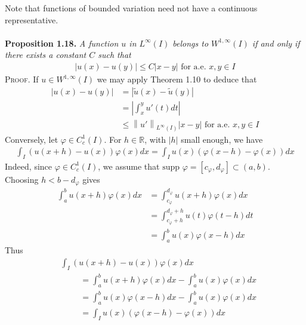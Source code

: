\documentclass[a4paper,oneside]{article}
\numberwithin{equation}{section}
\begin{document}
Note that functions of bounded variation need not have a continuous representative.\\
\\
\textbf{Proposition 1.18.} \textit{A function $u$ in $L^\infty \left(I\right)$ belongs to $W^{1,\infty}\left(I\right)$ if and only if there exists a constant $C$ such that}
\begin{align}
\label{1.101}
\left| {u\left( x \right) - u\left( y \right)} \right| \le C\left| {x - y} \right|\mbox{ for a.e. }x,y \in I
\end{align}
\textsc{Proof.} If $u \in {W^{1,\infty }}\left( I \right)$ we may apply Theorem 1.10 to deduce that
\begin{align}
\left| {u\left( x \right) - u\left( y \right)} \right| &= \left| {\tilde u\left( x \right) - \tilde u\left( y \right)} \right|\\
 &= \left| {\int_x^y {u'\left( t \right)dt} } \right|\\
 &\le {\left\| {u'} \right\|_{{L^\infty }\left( I \right)}}\left| {x - y} \right|\mbox{ for a.e. }x,y \in I
\end{align}
Conversely, let $\varphi  \in C_c^1\left( I \right)$. For $h\in \mathbb{R}$, with $\left| h \right|$ small enough, we have
\begin{align}
\int_I {\left( {u\left( {x + h} \right) - u\left( x \right)} \right)\varphi \left( x \right)dx}  = \int_I {u\left( x \right)\left( {\varphi \left( {x - h} \right) - \varphi \left( x \right)} \right)dx} 
\end{align}
Indeed, since $\varphi  \in C_c^1\left( I \right)$, we assume that $\mbox{supp }\varphi  = \left[ {c_\varphi,d_\varphi} \right] \subset \left( {a,b} \right)$. Choosing $h < b - {d_\varphi }$ gives
\begin{align}
\int_a^b {u\left( {x + h} \right)\varphi \left( x \right)dx}  &= \int_{{c_\varphi }}^{{d_\varphi }} {u\left( {x + h} \right)\varphi \left( x \right)dx} \\
 &= \int_{{c_\varphi } + h}^{{d_\varphi } + h} {u\left( t \right)\varphi \left( {t - h} \right)dt} \\
 &= \int_a^b {u\left( x \right)\varphi \left( {x - h} \right)dx} 
\end{align}
Thus
\begin{align}
&\int_I {\left( {u\left( {x + h} \right) - u\left( x \right)} \right)\varphi \left( x \right)dx} \\
& \hspace{1cm}= \int_a^b {u\left( {x + h} \right)\varphi \left( x \right)dx}  - \int_a^b {u\left( x \right)\varphi \left( x \right)dx} \\
& \hspace{1cm} = \int_a^b {u\left( x \right)\varphi \left( {x - h} \right)dx}  - \int_a^b {u\left( x \right)\varphi \left( x \right)dx} \\
& \hspace{1cm} = \int_I {u\left( x \right)\left( {\varphi \left( {x - h} \right) - \varphi \left( x \right)} \right)dx} 
\end{align}
\end{document}
